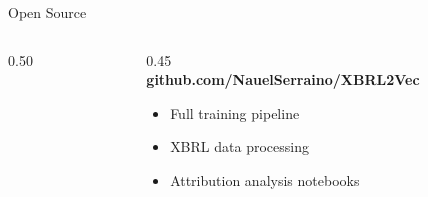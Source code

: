 \documentclass[aspectratio=169]{beamer}
\begin{document}
\begin{frame}{Open Source}

  \begin{columns}[c]
    \begin{column}{0.50\textwidth}
      \centering
    \end{column}
    \begin{column}{0.45\textwidth}
      \centering
      {\Huge \faGithub}\\[1em]
      \textbf{\large github.com/NauelSerraino/XBRL2Vec}\\[1.5em]
      \small
      \begin{itemize}
        \item Full training pipeline
        \item XBRL data processing
        \item Attribution analysis notebooks
      \end{itemize}
    \end{column}
  \end{columns}

\end{frame}
\end{document}
